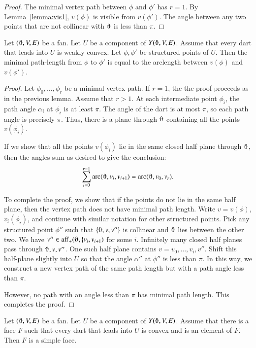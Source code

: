 \begin{proof}  The minimal vertex path between $\phi$ and $\phi'$ has $r=1$.
By Lemma~\ref{lemma:vis1}, $v(\phi)$ is visible from $v(\phi')$.  The angle between any two points that are not collinear with $\orgn$ is less than $\pi$. 
\end{proof}

\begin{lemma}\label{lemma:path-arc}
Let $(\orgn,V,E)$ be a fan.  Let $U$ be a component of $Y(\orgn,V,E)$.
Assume that every dart that leads into $U$ is weakly convex.  Let
$\phi,\phi'$ be structured points of $U$.  Then the minimal path-length
from $\phi$ to $\phi'$ is equal to the arclength between $v(\phi)$ and
$v(\phi')$.
\end{lemma}

\begin{proof}  Let $\phi_0,\ldots,\phi_r$ be a minimal vertex path.
If $r=1$, the the proof proceeds as in the previous lemma. Assume that $r>1$.
At each intermediate point $\phi_i$, 
the path angle $\alpha_i$ at $\phi_i$ is at least $\pi$.  The angle of the dart is at most $\pi$, so each path angle is precisely $\pi$.  Thus, there is a plane through $\orgn$ containing all the points $v(\phi_i)$.  

If we show that all the points $v(\phi_i)$ lie in the same closed half plane through $\orgn$, then the angles sum as desired to give the conclusion:
  $$
  \sum_{i=0}^{r-1}\arc(\orgn,v_i,v_{i+1}) = \arc(\orgn,v_0,v_r).
  $$

To complete the proof, we show that if the points do not lie in the same half plane, then the vertex path does not have minimal path length.  
Write $v=v(\phi)$, $v_i(\phi_i)$,
and continue with similar notation for other structured points.
Pick any structured point $\phi''$ such that
$\{\orgn,v,v''\}$ 
is collinear and $\orgn$ lies between the other two.  
We have $v''\in \op{aff}_+(\orgn,\{v_i,v_{i+1})$ for some $i$.
Infinitely many closed half planes pass through $\orgn,v,v''$.  One such half
plane contains $v=v_0,\ldots,v_i,v''$.  Shift this half-plane slightly
into $U$ so that the angle $\alpha''$ at $\phi''$ is less than $\pi$.
In this way, we construct a new vertex path
of the same path length but with a path angle less than $\pi$.

However, no path with an angle less than $\pi$ has minimal path length.
This completes the proof.
\end{proof}

\begin{lemma} Let $(\orgn,V,E)$ be a fan.  Let $U$ be a component
of $Y(\orgn,V,E)$.  Assume that there is a face $F$ such that every
dart that leads into $U$ is convex and is an element of $F$.  Then
$F$ is a simple face.
\end{lemma}

